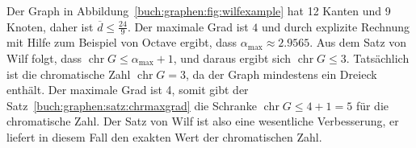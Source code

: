 \begin{beispiel}
Der Graph in Abbildung~\ref{buch:graphen:fig:wilfexample} hat 12 Kanten und 9
Knoten, daher ist $\overline{d}\le \frac{24}{9}$.
Der maximale Grad ist $4$ und durch explizite Rechnung mit Hilfe zum Beispiel
von Octave ergibt, dass $\alpha_{\text{max}}\approx 2.9565$.
Aus dem Satz von Wilf folgt, dass
$\operatorname{chr}G\le \alpha_{\text{max}}+1$, und daraus ergibt sich
$\operatorname{chr}G\le 3$.
Tatsächlich ist die chromatische Zahl $\operatorname{chr}G=3$, da 
der Graph mindestens ein Dreieck enthält.
Der maximale Grad ist 4, somit gibt der
Satz~\ref{buch:graphen:satz:chrmaxgrad}
die Schranke 
$\operatorname{chr}G\le 4+1=5$
für die chromatische Zahl.
Der Satz von Wilf ist also eine wesentliche Verbesserung, er liefert in
diesem Fall den exakten Wert der chromatischen Zahl.
\end{beispiel}



